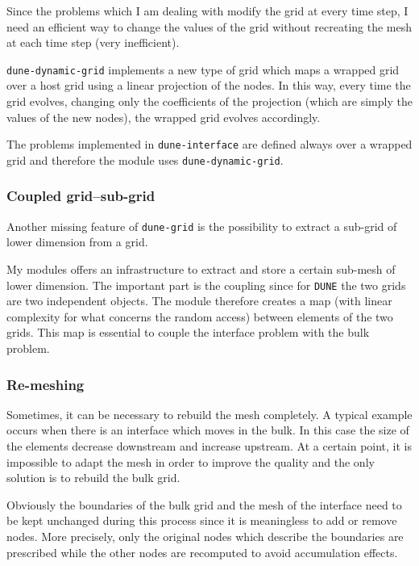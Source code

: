 \documentclass[a4paper,11pt, onecolumn]{article}
\begin{document}
Since the problems which I am dealing with modify the grid at every time step, I
need an efficient way to change the values of the grid without recreating the
mesh at each time step (very inefficient).

\verb|dune-dynamic-grid| implements a new type of grid which maps a wrapped grid
over a host grid using a linear projection of the nodes. In this way, every time
the grid evolves, changing only the coefficients of the projection (which are
simply the values of the new nodes), the wrapped grid evolves accordingly.
\newline

The problems implemented in \verb|dune-interface| are defined always over a
wrapped grid and therefore the module uses \verb|dune-dynamic-grid|.

\subsubsection{Coupled grid--sub-grid}

Another missing feature of \verb|dune-grid| is the possibility to extract a
sub-grid of lower dimension from a grid.
\newline

My modules offers an infrastructure to extract and store a certain sub-mesh of
lower dimension. The important part is the coupling since for \verb|DUNE| the
two grids are two independent objects. The module therefore creates a map (with
linear complexity for what concerns the random access) between elements of the
two grids. This map is essential to couple the interface problem with the bulk
problem.

\subsubsection{Re-meshing}

Sometimes, it can be necessary to rebuild the mesh completely. A typical example
occurs when there is an interface which moves in the bulk. In this case the size
of the elements decrease downstream and increase upstream. At a certain point,
it is impossible to adapt the mesh in order to improve the quality and the only
solution is to rebuild the bulk grid.

Obviously the boundaries of the bulk grid and the mesh of the interface need to
be kept unchanged during this process since it is meaningless to add or remove
nodes. More precisely, only the original nodes which describe the boundaries are
prescribed while the other nodes are recomputed to avoid accumulation effects.
\newline
\end{document}
